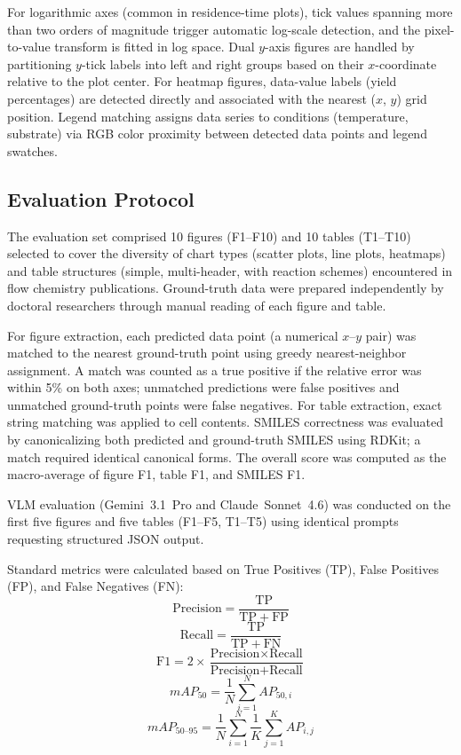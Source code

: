 \documentclass[journal=jcisd8,manuscript=article]{achemso}
\begin{document}
For logarithmic axes (common in residence-time plots), tick values spanning more than two orders of magnitude trigger automatic log-scale detection, and the pixel-to-value transform is fitted in log space.
Dual $y$-axis figures are handled by partitioning $y$-tick labels into left and right groups based on their $x$-coordinate relative to the plot center.
For heatmap figures, data-value labels (yield percentages) are detected directly and associated with the nearest ($x$, $y$) grid position.
Legend matching assigns data series to conditions (temperature, substrate) via RGB color proximity between detected data points and legend swatches.

\subsection{Evaluation Protocol}
\label{sec:eval}
The evaluation set comprised 10 figures (F1--F10) and 10 tables (T1--T10) selected to cover the diversity of chart types (scatter plots, line plots, heatmaps) and table structures (simple, multi-header, with reaction schemes) encountered in flow chemistry publications.
Ground-truth data were prepared independently by doctoral researchers through manual reading of each figure and table.

For figure extraction, each predicted data point (a numerical $x$--$y$ pair) was matched to the nearest ground-truth point using greedy nearest-neighbor assignment.
A match was counted as a true positive if the relative error was within 5\% on both axes; unmatched predictions were false positives and unmatched ground-truth points were false negatives.
For table extraction, exact string matching was applied to cell contents.
SMILES correctness was evaluated by canonicalizing both predicted and ground-truth SMILES using RDKit; a match required identical canonical forms.
The overall score was computed as the macro-average of figure F1, table F1, and SMILES F1.

VLM evaluation (Gemini~3.1~Pro and Claude~Sonnet~4.6) was conducted on the first five figures and five tables (F1--F5, T1--T5) using identical prompts requesting structured JSON output.

Standard metrics were calculated based on True Positives (TP), False Positives (FP), and False Negatives (FN):
\begin{equation}
\text{Precision} = \frac{\mathrm{TP}}{\mathrm{TP}+\mathrm{FP}}
\end{equation}
\begin{equation}
\text{Recall} = \frac{\mathrm{TP}}{\mathrm{TP}+\mathrm{FN}}
\end{equation}
\begin{equation}
\text{F1} = 2 \times \frac{\text{Precision} \times \text{Recall}}{\text{Precision} + \text{Recall}}
\end{equation}
\begin{equation}
mAP_{50} = \frac{1}{N} \sum_{i=1}^N AP_{50, i}
\end{equation}
\begin{equation}
mAP_{50\text{--}95} = \frac{1}{N} \sum_{i=1}^N \frac{1}{K} \sum_{j=1}^K AP_{i, j}
\end{equation}
\end{document}
